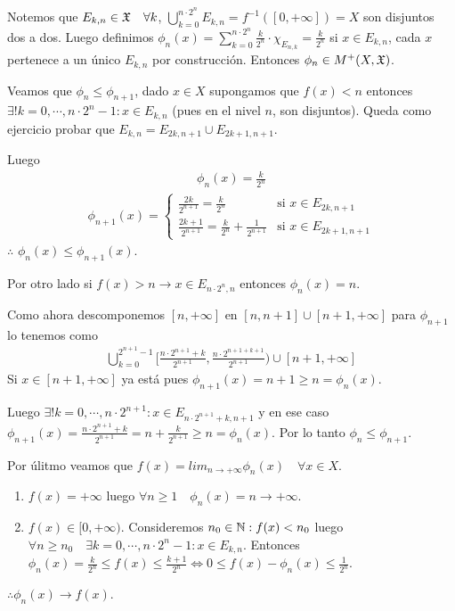 Notemos que $E_{k, n} \in \mathfrak{X} \quad \forall k$, $\bigcup_{k = 0}^{n \cdot 2^n} E_{k, n} = f^{-1}([0, +\infty]) = X$ son disjuntos dos a dos.
Luego definimos $\phi_n(x) = \sum_{k = 0}^{n \cdot 2^n} \frac{k}{2^n} \cdot \chi_{E_{n, k}} = \frac{k}{2^n}$ si $x \in E_{k, n}$, cada $x$ pertenece a un único $E_{k, n}$ por construcción.
Entonces $\phi_n \in M^+(X ,\mathfrak{X})$.

Veamos que $\phi_n \leq \phi_{n+1}$, dado $x \in X$ supongamos que $f(x) < n$ entonces $\exists! k = 0, \cdots, n \cdot 2^n - 1 : x \in E_{k, n}$ (pues en el nivel $n$, son disjuntos).
Queda como ejercicio probar que $E_{k, n} = E_{2k, n+1} \cup E_{2k+1, n+1}$.

Luego
\begin{align*}
    \phi_n(x) = \frac{k}{2^n}
\end{align*}
\begin{align*}\phi_{n+1}(x) = \begin{cases}
                        \frac{2k}{2^{n+1}} = \frac{k}{2^n}                       & \text{si } x \in E_{2k, n+1}   \\
                        \frac{2k+1}{2^{n+1}} = \frac{k}{2^n} + \frac{1}{2^{n+1}} & \text{si } x \in E_{2k+1, n+1}
                    \end{cases}
\end{align*} $\therefore$ $\phi_n(x) \leq \phi_{n+1}(x)$.

Por otro lado si $f(x) > n \to x \in E_{n \cdot 2^n, n}$ entonces $\phi_n(x) = n$.

Como ahora descomponemos $[n, +\infty]$ en $[n, n+1] \cup [n+1, +\infty]$ para $\phi_{n+1}$ lo tenemos como \begin{align*}
    \bigcup_{k = 0}^{2^{n+1}-1} [ \frac{n \cdot 2^{n+1} + k}{2^{n+1}}, \frac{n \cdot 2^{n+1 + k+1}}{2^{n+1}} ) \cup [n+1, +\infty]
\end{align*}
Si $x \in [n+1, +\infty]$ ya está pues $\phi_{n+1}(x) = n+1 \geq n = \phi_n(x)$.

Luego $\exists ! k = 0, \cdots, n \cdot 2^{n+1} : x \in E_{n \cdot 2^{n+1}+k, n+1}$ y en ese caso
$\phi_{n+1}(x) = \frac{n \cdot 2^{n+1} + k}{2^{n+1}} = n + \frac{k}{2^{n+1}} \geq n = \phi_n(x)$.
Por lo tanto $\phi_n \leq \phi_{n+1}$.

Por úlitmo veamos que $f(x) = lim_{n \to +\infty} \phi_n(x) \quad \forall x \in X$.
\begin{enumerate}
    \item $f(x) = +\infty$ luego $\forall n \geq 1 \quad \phi_n(x) = n \to +\infty$.
    \item $f(x) \in [0, +\infty)$. Consideremos $n_0 \in \mathbb{N} : f(x) < n_0$ luego $\forall n \geq n_0 \quad \exists k = 0, \cdots, n \cdot 2^n - 1 : x \in E_{k, n}$.
          Entonces $\phi_n(x) = \frac{k}{2^n} \leq f(x) \leq \frac{k+1}{2^n} \iff 0 \leq f(x) - \phi_n(x) \leq \frac{1}{2^n}$.
\end{enumerate}
$\therefore \phi_n(x) \to f(x)$.

